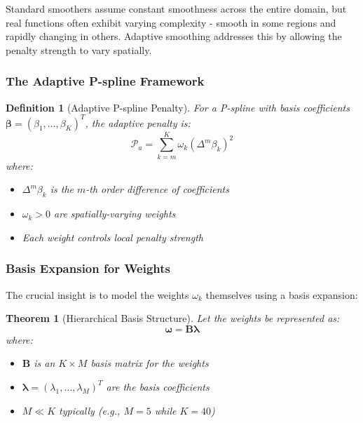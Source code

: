 \documentclass[12pt]{article}
\newtheorem{theorem}{Theorem}
\newtheorem{definition}{Definition}
\begin{document}
Standard smoothers assume constant smoothness across the entire domain, but real functions often exhibit varying complexity - smooth in some regions and rapidly changing in others. Adaptive smoothing addresses this by allowing the penalty strength to vary spatially.

\subsubsection{The Adaptive P-spline Framework}

\begin{definition}[Adaptive P-spline Penalty]
For a P-spline with basis coefficients $\boldsymbol{\beta} = (\beta_1, \ldots, \beta_K)^T$, the adaptive penalty is:
\begin{equation}
\mathcal{P}_a = \sum_{k=m}^{K} \omega_k (\Delta^m \beta_k)^2
\end{equation}
where:
\begin{itemize}
    \item $\Delta^m \beta_k$ is the $m$-th order difference of coefficients
    \item $\omega_k > 0$ are spatially-varying weights
    \item Each weight controls local penalty strength
\end{itemize}
\end{definition}

\subsubsection{Basis Expansion for Weights}

The crucial insight is to model the weights $\omega_k$ themselves using a basis expansion:

\begin{theorem}[Hierarchical Basis Structure]
Let the weights be represented as:
\begin{equation}
\boldsymbol{\omega} = \mathbf{B}\boldsymbol{\lambda}
\end{equation}
where:
\begin{itemize}
    \item $\mathbf{B}$ is an $K \times M$ basis matrix for the weights
    \item $\boldsymbol{\lambda} = (\lambda_1, \ldots, \lambda_M)^T$ are the basis coefficients
    \item $M \ll K$ typically (e.g., $M=5$ while $K=40$)
\end{itemize}
\end{theorem}
\end{document}
